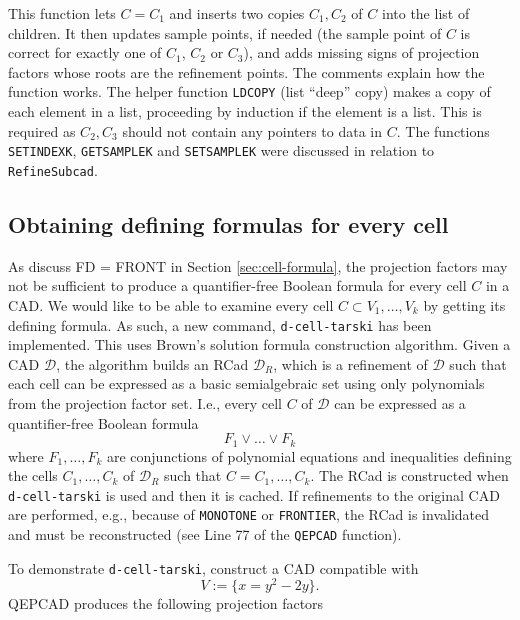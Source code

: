 \documentclass[
]{book}
\theoremstyle{definition}
\theoremstyle{definition}
\theoremstyle{definition}
\theoremstyle{definition}
\theoremstyle{remark}
\begin{document}
This function lets \(C = C_1\) and inserts two copies \(C_1,C_2\) of \(C\) into the list of children. It then updates sample points, if needed (the sample point of \(C\) is correct for exactly one of \(C_1\), \(C_2\) or \(C_3\)), and adds missing signs of projection factors whose roots are the refinement points.
The comments explain how the function works. The helper function \texttt{LDCOPY} (list ``deep'' copy) makes a copy of each element in a list, proceeding by induction if the element is a list. This is required as \(C_2,C_3\) should not contain any pointers to data in \(C\). The functions \texttt{SETINDEXK}, \texttt{GETSAMPLEK} and \texttt{SETSAMPLEK} were discussed in relation to \texttt{RefineSubcad}.

\hypertarget{obtaining-defining-formulas-for-every-cell}{%
\subsection{Obtaining defining formulas for every cell}\label{obtaining-defining-formulas-for-every-cell}}

As discuss FD = FRONT
in Section \ref{sec:cell-formula}, the projection factors may not be sufficient to produce a quantifier-free Boolean formula for every cell \(C\) in a CAD.
We would like to be able to examine every cell \(C \subset V_1,\ldots,V_k\) by getting its defining formula.
As such, a new command, \texttt{d-cell-tarski} has been implemented.
This uses Brown's solution formula construction algorithm. Given a CAD \(\mathcal{D}\), the algorithm builds an RCad \(\mathcal{D}_R\), which is a refinement of \(\mathcal{D}\) such that each cell can be expressed as a basic semialgebraic set using only polynomials from the projection factor set. I.e., every cell \(C\) of \(\mathcal{D}\) can be expressed as a quantifier-free Boolean formula
\[
F_1 \lor \ldots \lor F_k
\]
where \(F_1,\ldots,F_k\) are conjunctions of polynomial equations and inequalities defining the cells \(C_1,\ldots,C_k\) of \(\mathcal{D}_R\) such that \(C = C_1,\ldots,C_k\).
The RCad is constructed when \texttt{d-cell-tarski} is used and then it is cached. If refinements to the original CAD are performed, e.g., because of \texttt{MONOTONE} or \texttt{FRONTIER}, the RCad is invalidated and must be reconstructed (see Line 77 of the \texttt{QEPCAD} function).

To demonstrate \texttt{d-cell-tarski}, construct a CAD compatible with \[
V := \{ x = y^2 - 2y \}.
\]
QEPCAD produces the following projection factors
\end{document}
